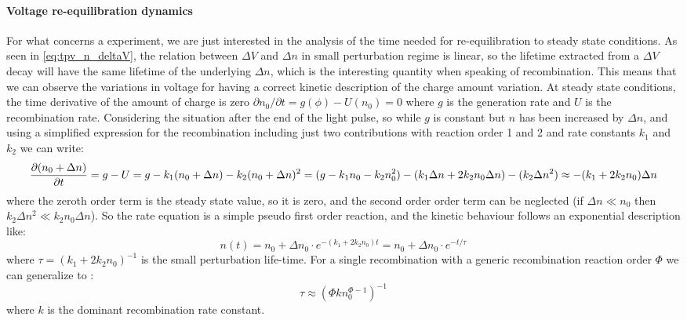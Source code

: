 		\paragraph{Voltage re\hyp{}equilibration dynamics}
		For what concerns a  experiment, we are just interested in the analysis of the time needed for re\hyp{}equilibration to steady state conditions.
		As seen in \cref{eq:tpv_n_deltaV}, the relation between $\Delta V$ and $\Delta n$ in small perturbation regime is linear, so the lifetime extracted from a $\Delta V$ decay will have the same lifetime of the underlying $\Delta n$, which is the interesting quantity when speaking of recombination.
		This means that we can observe the variations in voltage for having a correct kinetic description of the charge amount variation.
		At steady state conditions, the time derivative of the amount of charge is zero $\partial n_0 / \partial t = g(\phi) - U(n_0) = 0$ where $g$ is the generation rate and $U$ is the recombination rate.
		Considering the situation after the end of the light pulse, so while $g$ is constant but $n$ has been increased by $\Delta n$, and using a simplified expression for the recombination including just two contributions with reaction order 1 and 2 and rate constants $k_1$ and $k_2$ we can write:
		\begin{dmath}
			\pdv{(n_0 + \Delta n)}{t} = g - U = g - k_1(n_0 + \Delta n) - k_2(n_0 + \Delta n)^2 = (g - k_1 n_0 - k_2 n_0^2) - (k_1 \Delta n + 2 k_2 n_0 \Delta n) - (k_2 \Delta n ^2) \approx - (k_1 + 2 k_2 n_0 ) \Delta n
		\end{dmath}
		where the zeroth order term is the steady state value, so it is zero, and the second order order term can be neglected (if $\Delta n \ll n_0$ then $k_2 \Delta n^2 \ll k_2 n_0 \Delta n$).
		So the rate equation is a simple pseudo first order reaction, and the kinetic behaviour follows an exponential description like:
		\begin{equation}\label{eq:tpv_monoexp}
			n (t) = n_0 + \Delta n_0 \cdot e^{-(k_1 + 2 k_2 n_0) t} = n_0 + \Delta n_0 \cdot e^{-t / \tau}
		\end{equation}
		where $\tau = (k_1 + 2 k_2 n_0)^{-1}$ is the small perturbation life\hyp{}time.
		For a single recombination with a generic recombination reaction order $\Phi$ we can generalize to \cite{Shuttle2008}:
		\begin{equation}\label{eq:tpv_tau_order}
			\tau \approx (\Phi k n_0^{\Phi-1})^{-1}
		\end{equation}
		where $k$ is the dominant recombination rate constant.

